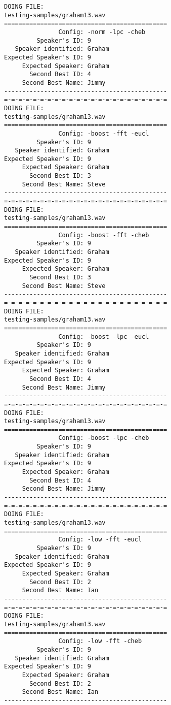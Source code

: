 \begin{verbatim}
DOING FILE:
testing-samples/graham13.wav
=============================================
               Config: -norm -lpc -cheb
         Speaker's ID: 9
   Speaker identified: Graham
Expected Speaker's ID: 9
     Expected Speaker: Graham
       Second Best ID: 4
     Second Best Name: Jimmy
---------------------------------------------
=-=-=-=-=-=-=-=-=-=-=-=-=-=-=-=-=-=-=-=-=-=-=
DOING FILE:
testing-samples/graham13.wav
=============================================
               Config: -boost -fft -eucl
         Speaker's ID: 9
   Speaker identified: Graham
Expected Speaker's ID: 9
     Expected Speaker: Graham
       Second Best ID: 3
     Second Best Name: Steve
---------------------------------------------
=-=-=-=-=-=-=-=-=-=-=-=-=-=-=-=-=-=-=-=-=-=-=
DOING FILE:
testing-samples/graham13.wav
=============================================
               Config: -boost -fft -cheb
         Speaker's ID: 9
   Speaker identified: Graham
Expected Speaker's ID: 9
     Expected Speaker: Graham
       Second Best ID: 3
     Second Best Name: Steve
---------------------------------------------
=-=-=-=-=-=-=-=-=-=-=-=-=-=-=-=-=-=-=-=-=-=-=
DOING FILE:
testing-samples/graham13.wav
=============================================
               Config: -boost -lpc -eucl
         Speaker's ID: 9
   Speaker identified: Graham
Expected Speaker's ID: 9
     Expected Speaker: Graham
       Second Best ID: 4
     Second Best Name: Jimmy
---------------------------------------------
=-=-=-=-=-=-=-=-=-=-=-=-=-=-=-=-=-=-=-=-=-=-=
DOING FILE:
testing-samples/graham13.wav
=============================================
               Config: -boost -lpc -cheb
         Speaker's ID: 9
   Speaker identified: Graham
Expected Speaker's ID: 9
     Expected Speaker: Graham
       Second Best ID: 4
     Second Best Name: Jimmy
---------------------------------------------
=-=-=-=-=-=-=-=-=-=-=-=-=-=-=-=-=-=-=-=-=-=-=
DOING FILE:
testing-samples/graham13.wav
=============================================
               Config: -low -fft -eucl
         Speaker's ID: 9
   Speaker identified: Graham
Expected Speaker's ID: 9
     Expected Speaker: Graham
       Second Best ID: 2
     Second Best Name: Ian
---------------------------------------------
=-=-=-=-=-=-=-=-=-=-=-=-=-=-=-=-=-=-=-=-=-=-=
DOING FILE:
testing-samples/graham13.wav
=============================================
               Config: -low -fft -cheb
         Speaker's ID: 9
   Speaker identified: Graham
Expected Speaker's ID: 9
     Expected Speaker: Graham
       Second Best ID: 2
     Second Best Name: Ian
---------------------------------------------

\end{verbatim}
